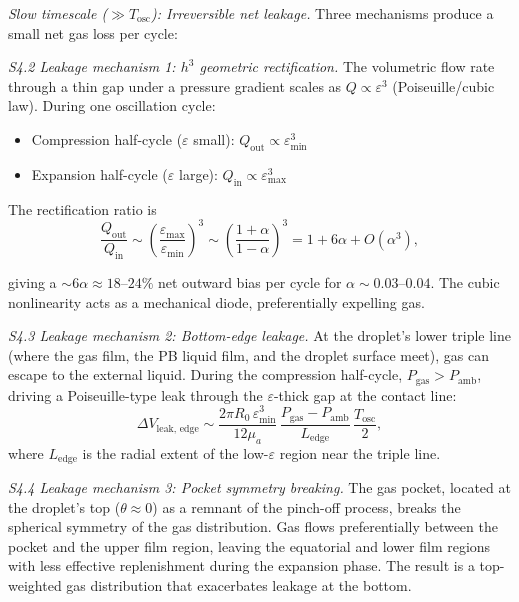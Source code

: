 \documentclass[%
 preprint,
 superscriptaddress,
 amsmath,amssymb,
 aps, prl,
]{revtex4-2}
\begin{document}
\textit{Slow timescale ($\gg T_{\text{osc}}$): Irreversible net leakage.}
Three mechanisms produce a small net gas loss per cycle:\par

{\noindent\textit{S4.2 Leakage mechanism 1: $h^3$ geometric rectification.}}
The volumetric flow rate through a thin gap under a pressure gradient scales as $Q \propto \varepsilon^3$ (Poiseuille/cubic law). During one oscillation cycle:
\begin{itemize}
\item Compression half-cycle ($\varepsilon$ small): $Q_{\text{out}} \propto \varepsilon_{\min}^3$
\item Expansion half-cycle ($\varepsilon$ large): $Q_{\text{in}} \propto \varepsilon_{\max}^3$
\end{itemize}

The rectification ratio is
\begin{equation}
\frac{Q_{\text{out}}}{Q_{\text{in}}}
\sim \left(\frac{\varepsilon_{\max}}{\varepsilon_{\min}}\right)^3
\sim \left(\frac{1+\alpha}{1-\alpha}\right)^3
= 1 + 6\alpha + O(\alpha^3),
\label{eq:s4_rectification}
\end{equation}

giving a $\sim 6\alpha \approx 18$--$24\%$ net outward bias per cycle for $\alpha \sim 0.03$--$0.04$. The cubic nonlinearity acts as a mechanical diode, preferentially expelling gas.\par

{\noindent\textit{S4.3 Leakage mechanism 2: Bottom-edge leakage.}}
At the droplet's lower triple line (where the gas film, the PB liquid film, and the droplet surface meet), gas can escape to the external liquid. During the compression half-cycle, $P_{\text{gas}} > P_{\text{amb}}$, driving a Poiseuille-type leak through the $\varepsilon$-thick gap at the contact line:
\begin{equation}
\Delta V_{\text{leak, edge}} \sim
\frac{2\pi R_0\,\varepsilon_{\min}^3}{12\mu_a}\,
\frac{P_{\text{gas}} - P_{\text{amb}}}{L_{\text{edge}}}\,
\frac{T_{\text{osc}}}{2},
\label{eq:s4_edge_leak}
\end{equation}
where $L_{\text{edge}}$ is the radial extent of the low-$\varepsilon$ region near the triple line.\par

{\noindent\textit{S4.4 Leakage mechanism 3: Pocket symmetry breaking.}}
The gas pocket, located at the droplet's top ($\theta \approx 0$) as a remnant of the pinch-off process, breaks the spherical symmetry of the gas distribution. Gas flows preferentially between the pocket and the upper film region, leaving the equatorial and lower film regions with less effective replenishment during the expansion phase. The result is a top-weighted gas distribution that exacerbates leakage at the bottom.\par
\end{document}
